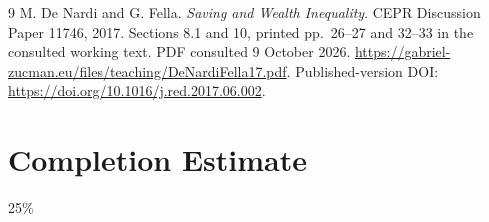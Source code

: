 \documentclass[11pt]{article}
\theoremstyle{remark}
\begin{document}
\begin{thebibliography}{9}
 M. De Nardi and G. Fella.
\emph{Saving and Wealth Inequality}. CEPR Discussion Paper 11746, 2017.
Sections 8.1 and 10, printed pp.~26--27 and 32--33 in the consulted
working text. PDF consulted 9 October 2026.
\url{https://gabriel-zucman.eu/files/teaching/DeNardiFella17.pdf}.
Published-version DOI: \url{https://doi.org/10.1016/j.red.2017.06.002}.
\end{thebibliography}

\section{Completion Estimate}
25\%
\end{document}
